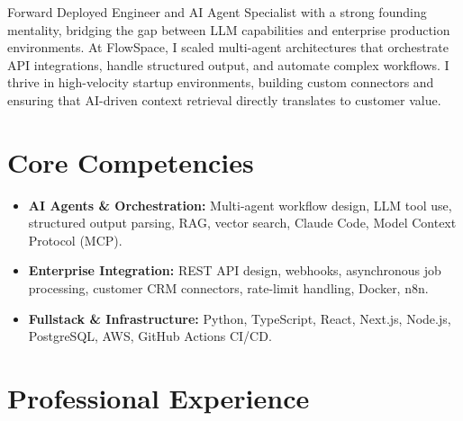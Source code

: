 \documentclass[11pt,a4paper,sans]{moderncv}
\begin{document}
\makecvtitle

Forward Deployed Engineer and AI Agent Specialist with a strong founding mentality, bridging the gap between LLM capabilities and enterprise production environments. At FlowSpace, I scaled multi-agent architectures that orchestrate API integrations, handle structured output, and automate complex workflows. I thrive in high-velocity startup environments, building custom connectors and ensuring that AI-driven context retrieval directly translates to customer value.

\section{Core Competencies}
\begin{itemize}
\item \textbf{AI Agents \& Orchestration:} Multi-agent workflow design, LLM tool use, structured output parsing, RAG, vector search, Claude Code, Model Context Protocol (MCP).
\item \textbf{Enterprise Integration:} REST API design, webhooks, asynchronous job processing, customer CRM connectors, rate-limit handling, Docker, n8n.
\item \textbf{Fullstack \& Infrastructure:} Python, TypeScript, React, Next.js, Node.js, PostgreSQL, AWS, GitHub Actions CI/CD.
\end{itemize}

\section{Professional Experience}
\end{document}
